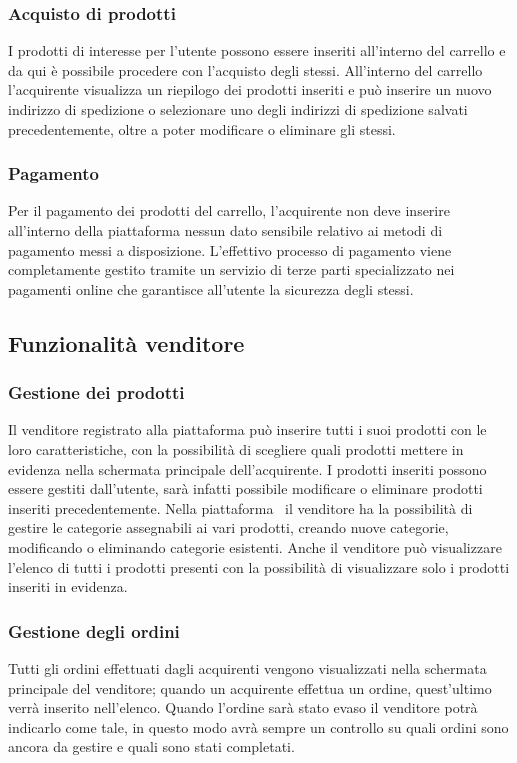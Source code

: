 \subsubsection*{Acquisto di prodotti}
I prodotti di interesse per l'utente possono essere inseriti all'interno del carrello e da qui è possibile procedere con l'acquisto degli stessi. All'interno del carrello l'acquirente visualizza un riepilogo dei prodotti inseriti e può inserire un nuovo indirizzo di spedizione o selezionare uno degli indirizzi di spedizione salvati precedentemente, oltre a poter modificare o eliminare gli stessi.
\subsubsection*{Pagamento}
Per il pagamento dei prodotti del carrello, l'acquirente non deve inserire all'interno della piattaforma nessun dato sensibile relativo ai metodi di pagamento messi a disposizione. L'effettivo processo di pagamento viene completamente gestito tramite un servizio di terze parti specializzato nei pagamenti online che garantisce all'utente la sicurezza degli stessi.
\subsection{Funzionalità venditore}\label{FunzionalitàVend}
\subsubsection*{Gestione dei prodotti}
Il venditore registrato alla piattaforma può inserire tutti i suoi prodotti con le loro caratteristiche, con la possibilità di scegliere quali prodotti mettere in evidenza nella schermata principale dell'acquirente. I prodotti inseriti possono essere gestiti dall'utente, sarà infatti possibile modificare o eliminare prodotti inseriti precedentemente. Nella piattaforma \NomeProgetto\ il venditore ha la possibilità di gestire le categorie assegnabili ai vari prodotti, creando nuove categorie, modificando o eliminando categorie esistenti. Anche il venditore può visualizzare l'elenco di tutti i prodotti presenti con la possibilità di visualizzare solo i prodotti inseriti in evidenza.
\subsubsection*{Gestione degli ordini}
Tutti gli ordini effettuati dagli acquirenti vengono visualizzati nella schermata principale del venditore; quando un acquirente effettua un ordine, quest'ultimo verrà inserito nell'elenco. Quando l'ordine sarà stato evaso il venditore potrà indicarlo come tale, in questo modo avrà sempre un controllo su quali ordini sono ancora da gestire e quali sono stati completati.